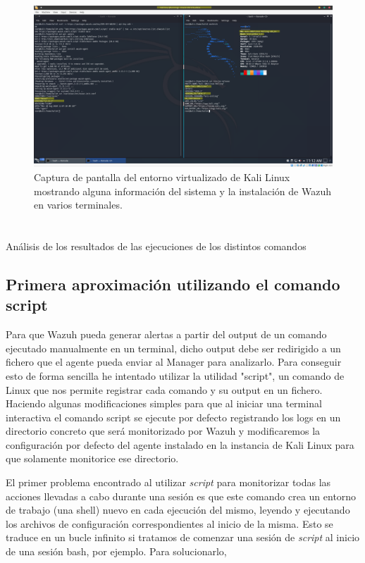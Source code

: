 \begin{figure}[hbt]
  \centering
      \includegraphics[width=\textwidth]{imagenes/kali_linux.png}
  \caption{Captura de pantalla del entorno virtualizado de Kali Linux mostrando alguna información del sistema y la instalación de Wazuh en varios terminales.}
\end{figure}

\section{}{Análisis de los resultados de las ejecuciones de los distintos comandos}
\subsection{Primera aproximación utilizando el comando script}

Para que Wazuh pueda generar alertas a partir del output de un comando ejecutado manualmente en un terminal, dicho output debe ser redirigido a un fichero que el agente pueda enviar al Manager para analizarlo. Para conseguir esto de forma sencilla he intentado utilizar la utilidad "script", un comando de Linux que nos permite registrar cada comando y su output en un fichero. Haciendo algunas modificaciones simples para que al iniciar una terminal interactiva el comando script se ejecute por defecto registrando los logs en un directorio concreto que será monitorizado por Wazuh y modificaremos la configuración por defecto del agente instalado en la instancia de Kali Linux para que solamente monitorice ese directorio.

El primer problema encontrado al utilizar \textit{script} para monitorizar todas las acciones llevadas a cabo durante una sesión es que este comando crea un entorno de trabajo (una shell) nuevo en cada ejecución del mismo, leyendo y ejecutando los archivos de configuración correspondientes al inicio de la misma. Esto se traduce en un bucle infinito si tratamos de comenzar una sesión de \textit{script} al inicio de una sesión bash, por ejemplo. Para solucionarlo, 

